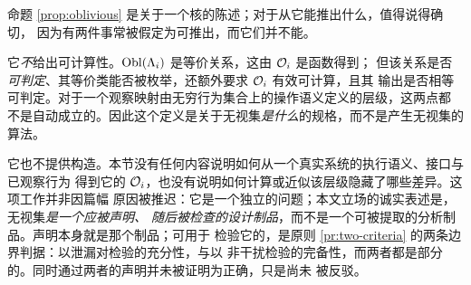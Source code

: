 \begin{remark}\label{rmk:kernel-limits}
命题 \ref{prop:oblivious} 是关于一个核的陈述；对于从它能推出什么，值得说得确切，
因为有两件事常被假定为可推出，而它们并不能。

它\emph{不}给出可计算性。$\operatorname{Obl}(\Lambda_i)$ 是等价关系，这由 $\mathcal{O}_i$ 是函数得到；
但该关系是否\emph{可判定}、其等价类能否被枚举，还额外要求 $\mathcal{O}_i$ 有效可计算，且其
输出是否相等可判定。对于一个观察映射由无穷行为集合上的操作语义定义的层级，这两点都
不是自动成立的。因此这个定义是关于无视集\emph{是什么}的规格，而不是产生无视集的
算法。

它也不提供构造。本节没有任何内容说明如何从一个真实系统的执行语义、接口与已观察行为
得到它的 $\mathcal{O}_i$，也没有说明如何计算或近似该层级隐藏了哪些差异。这项工作并非因篇幅
原因被推迟：它是一个独立的问题；本文立场的诚实表述是，无视集\emph{是一个应被声明、
随后被检查的设计制品}，而不是一个可被提取的分析制品。声明本身就是那个制品；可用于
检验它的，是原则 \ref{pr:two-criteria} 的两条边界判据：以泄漏对检验的充分性，与以
非干扰检验的完备性，而两者都是部分的。同时通过两者的声明并未被证明为正确，只是尚未
被反驳。
\end{remark}

